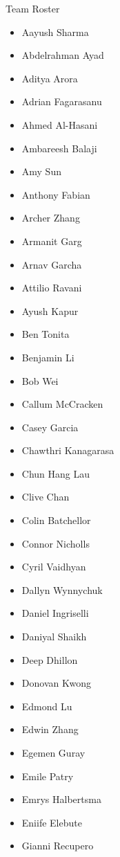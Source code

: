\documentclass[main.tex]{subfiles}
\begin{document}
\begin{center}\LARGE{Team Roster}\end{center}
\begin{multicols}{3}
 \begin{itemize}[label={},noitemsep]
     \item \small{Aayush Sharma}
     \item {Abdelrahman Ayad}
     \item {Aditya Arora}
     \item {Adrian Fagarasanu}
     \item {Ahmed Al-Hasani}
	 \item {Ambareesh Balaji}
     \item {Amy Sun}
	 \item {Anthony Fabian}
     \item {Archer Zhang}
	 \item {Armanit Garg}
     \item {Arnav Garcha}
	 \item {Attilio Ravani}
     \item {Ayush Kapur}
	 \item {Ben Tonita}
     \item {Benjamin Li}
	 \item {Bob Wei}
     \item {Callum McCracken}
	 \item {Casey Garcia}
     \item {Chawthri Kanagarasa}
	 \item {Chun Hang Lau}
     \item {Clive Chan}
	 \item {Colin Batchellor}
     \item {Connor Nicholls}
	 \item {Cyril Vaidhyan}
     \item {Dallyn Wynnychuk}
	 \item {Daniel Ingriselli}
     \item {Daniyal Shaikh}
	 \item {Deep Dhillon}
     \item {Donovan Kwong}
	 \item {Edmond Lu}
     \item {Edwin Zhang}
	 \item {Egemen Guray}
     \item {Emile Patry}
	 \item {Emrys Halbertsma}
     \item {Eniife Elebute}
	 \item {Gianni Recupero}

\end{itemize}
\end{multicols}
\end{document}

